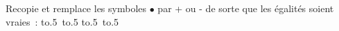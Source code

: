 \documentclass[exercice]{thedocument}%
\begin{document}
%
Recopie et remplace les symboles $\bullet$ par + ou - de sorte que les égalités
soient vraies~:\vskip10pt\noindent
\hbox{\hbox to.5%
    \hbox to.5}\vskip10pt
\hbox{\hbox to.5%
    \hbox to.5}
\end{document}
